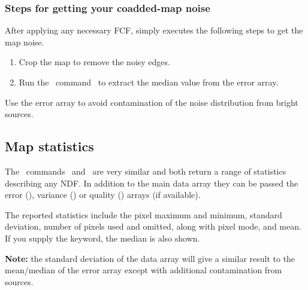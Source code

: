 \subsubsection*{Steps for getting your coadded-map noise}
After applying any necessary FCF,  simply
executes the following steps to get the map noise.

\begin{enumerate}
\item Crop the map to remove the noisy edges.

\begin{terminalv}
\end{terminalv}

\item Run the \Kappa\ command \stats\ to extract the median value from
the error array.

\begin{terminalv}
\end{terminalv}

\end{enumerate}

\begin{tip}
  Use the error array to avoid contamination of the noise distribution
  from bright sources.
\end{tip}


\subsection{Map statistics}

The \Kappa\ commands \histat\ and \stats\ are very similar and both
return a range of statistics describing any NDF. In addition to the
main data array they can be passed the error (), variance
() or quality () arrays (if available).

The reported statistics include the pixel maximum and minimum,
standard deviation, number of pixels used and omitted, along with
pixel mode, and mean.  If you supply the  keyword,
the median is also shown.

\begin{terminalv}
\end{terminalv}

\textbf{Note:} the standard deviation of the data array will give a
similar result to the mean/median of the error array except with
additional contamination from sources.



